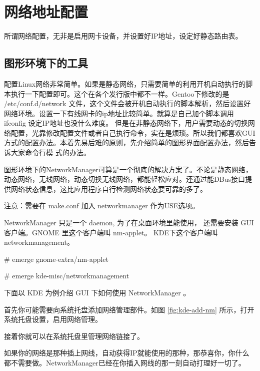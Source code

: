 
\section{网络地址配置}\label{sec:ifconfig}

所谓网络配置，无非是启用网卡设备，并设置好IP地址，设定好静态路由表。

\subsection{图形环境下的工具}\label{sec:networkmanager}

配置Linux网络非常简单。如果是静态网络，只需要简单的利用开机自动执行的脚本执行一下配置即可。这个在各个发行版中都不一样。Gentoo下修改的是 /etc/conf.d/network 文件，这个文件会被开机自动执行的脚本解析，然后设置好网络环境。设置一下有线网卡的ip地址比较简单。就算是自己加个脚本调用 ifconfig 设定IP地址也没什么难度。
但是在非静态网络下，用户需要动态的切换网络配置，光靠修改配置文件或者自己执行命令，实在是烦琐。所以我们都喜欢GUI方式的配置办法。本着先易后难的原则，先介绍简单的图形界面配置办法，然后告诉大家命令行模
式的办法。

图形环境下的NetworkManager可算是一个彻底的解决方案了。不论是静态网络，动态网络，无线网络，动态切换无线网络，都能轻松应对。还通过能DBus接口提供网络状态信息，这比应用程序自行检测网络状态要可靠的多了。
\begin{notice}
注意：需要在 make.conf 加入 networkmanager 作为USE选项。
\end{notice}

NetworkManager 只是一个 daemon, 为了在桌面环境里能使用， 还需要安装 GUI 客户端。GNOME 里这个客户端叫 nm-applet。
KDE下这个客户端叫 networkmanagement。

\begin{code}
\# emerge gnome-extra/nm-applet

\# emerge kde-misc/networkmanagement
\end{code}

下面以 KDE 为例介绍 GUI 下如何使用 NetworkManager 。

首先你可能需要向系统托盘添加网络管理部件。如图 \ref{fig:kde-add-nm} 所示，打开系统托盘设置，启用网络管理。


接着你就可以在系统托盘里管理网络链接了。

如果你的网络是那种插上网线，自动获得IP就能使用的那种，那恭喜你，你什么都不需要做。NetworkManager已经在你插入网线的那一刻自动打理好一切了。

